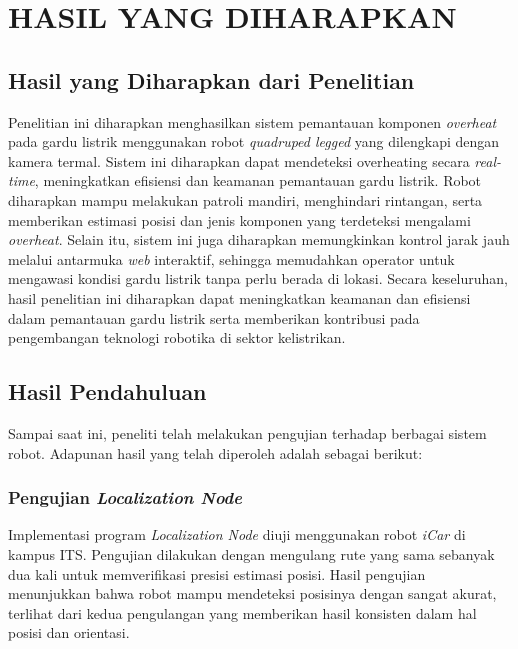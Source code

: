 \chapter{HASIL YANG DIHARAPKAN}

\section{Hasil yang Diharapkan dari Penelitian}

Penelitian ini diharapkan menghasilkan sistem pemantauan komponen \emph{overheat} pada gardu listrik menggunakan robot \emph{quadruped legged} yang dilengkapi dengan kamera termal. Sistem ini diharapkan dapat mendeteksi overheating secara \emph{real-time}, meningkatkan efisiensi dan keamanan pemantauan gardu listrik. Robot diharapkan mampu melakukan patroli mandiri, menghindari rintangan, serta memberikan estimasi posisi dan jenis komponen yang terdeteksi mengalami \emph{overheat}. Selain itu, sistem ini juga diharapkan memungkinkan kontrol jarak jauh melalui antarmuka \emph{web} interaktif, sehingga memudahkan operator untuk mengawasi kondisi gardu listrik tanpa perlu berada di lokasi. Secara keseluruhan, hasil penelitian ini diharapkan dapat meningkatkan keamanan dan efisiensi dalam pemantauan gardu listrik serta memberikan kontribusi pada pengembangan teknologi robotika di sektor kelistrikan.

\section{Hasil Pendahuluan}

Sampai saat ini, peneliti telah melakukan pengujian terhadap berbagai sistem robot. Adapunan hasil yang telah diperoleh adalah sebagai berikut:

\subsection{Pengujian \emph{Localization Node}}
Implementasi program \emph{Localization Node} diuji menggunakan robot \emph{iCar} di kampus ITS. Pengujian dilakukan dengan mengulang rute yang sama sebanyak dua kali untuk memverifikasi presisi estimasi posisi. Hasil pengujian menunjukkan bahwa robot mampu mendeteksi posisinya dengan sangat akurat, terlihat dari kedua pengulangan yang memberikan hasil konsisten dalam hal posisi dan orientasi.

